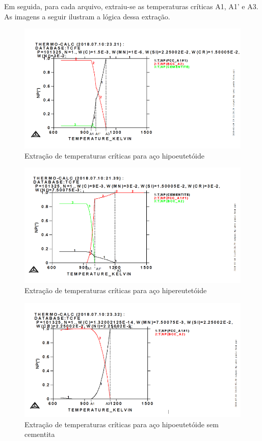 \documentclass[brazil,tf,epusp]{usp}  %
\begin{document}
Em seguida, para cada arquivo, extraiu-se as temperaturas críticas A1, A1' e A3. As imagens a seguir ilustram a lógica dessa extração.

\begin{figure}
  \includegraphics[width=.9\textwidth]{img/714editado.png}
  \caption{Extração de temperaturas críticas para aço hipoeutetóide}
  \label{fig:Tcrit_liga_hipo}
\end{figure}

\begin{figure}
  \includegraphics[width=.9\textwidth]{img/4321editado.png}
  \caption{Extração de temperaturas críticas para aço hipereutetóide}
  \label{fig:Tcrit_liga_hiper}
\end{figure}

\begin{figure}
  \includegraphics[width=.9\textwidth]{img/418editado.png}
  \caption{Extração de temperaturas críticas para aço hipoeutetóide sem cementita}
  \label{fig:Tcrit_liga_sem_cementita}
\end{figure}
\end{document}
